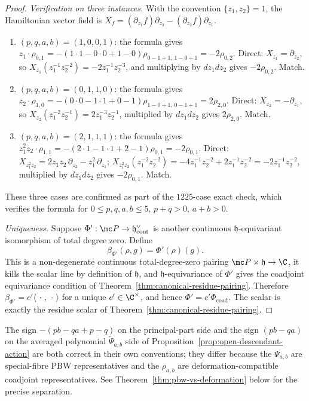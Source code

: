 \documentclass[11pt]{memoir}
\begin{document}
\begin{proof}
  \emph{Verification on three instances.} With the convention
  $\{z_1,z_2\}=1$, the Hamiltonian vector field is
  $X_f=(\partial_{z_1}f)\partial_{z_2}-(\partial_{z_2}f)\partial_{z_1}$.
  \begin{enumerate}
    \item $(p,q,a,b)=(1,0,0,1)$: the formula gives
      $z_1\cdot\rho_{0,1}=-(1\cdot1-0\cdot0+1-0)\rho_{0-1+1,\,1-0+1}=-2\rho_{0,2}$.
      Direct: $X_{z_1}=\partial_{z_2}$, so
      $X_{z_1}(z_1^{-1}z_2^{-2})=-2z_1^{-1}z_2^{-3}$, and multiplying by
      $dz_1dz_2$ gives $-2\rho_{0,2}$. Match.
    \item $(p,q,a,b)=(0,1,1,0)$: the formula gives
      $z_2\cdot\rho_{1,0}=-(0\cdot0-1\cdot1+0-1)\rho_{1-0+1,\,0-1+1}=2\rho_{2,0}$.
      Direct: $X_{z_2}=-\partial_{z_1}$, so
      $X_{z_2}(z_1^{-2}z_2^{-1})=2z_1^{-3}z_2^{-1}$, multiplied by
      $dz_1dz_2$ gives $2\rho_{2,0}$. Match.
    \item $(p,q,a,b)=(2,1,1,1)$: the formula gives
      $z_1^2z_2\cdot\rho_{1,1}=-(2\cdot1-1\cdot1+2-1)\rho_{0,1}=-2\rho_{0,1}$.
      Direct:
      $X_{z_1^2z_2}=2z_1z_2\,\partial_{z_2}-z_1^2\,\partial_{z_1}$;
      $X_{z_1^2z_2}(z_1^{-2}z_2^{-2})
       =-4z_1^{-1}z_2^{-2}+2z_1^{-1}z_2^{-2}
       =-2z_1^{-1}z_2^{-2}$, multiplied by $dz_1dz_2$ gives
      $-2\rho_{0,1}$. Match.
  \end{enumerate}
  These three cases are confirmed as part of the \(1225\)-case exact
  check, which verifies the formula for \(0\le p,q,a,b\le5\),
  \(p+q>0\), \(a+b>0\).

  \emph{Uniqueness.} Suppose $\Phi':\mc P\to\mathfrak h^\vee_{\mathrm{cont}}$
  is another continuous $\mathfrak h$-equivariant isomorphism of total
  degree zero. Define
  $$\beta_{\Phi'}(\rho,g)=\Phi'(\rho)(g).$$
  This is a non-degenerate continuous total-degree-zero pairing
  $\mc P\times\mathfrak h\to\C$, it kills the scalar line by definition
  of $\mathfrak h$, and $\mathfrak h$-equivariance of $\Phi'$ gives the
  coadjoint equivariance condition of
  Theorem~\ref{thm:canonical-residue-pairing}. Therefore
  $\beta_{\Phi'}=c'\langle\,\cdot\,,\,\cdot\,\rangle$ for a unique
  $c'\in\C^\times$, and hence
  $\Phi'=c'\Phi_{\mathrm{coad}}$. The scalar is exactly the residue
  scalar of Theorem~\ref{thm:canonical-residue-pairing}.
\end{proof}

\begin{rmk}\label{rmk:psi-rho-sign-convention}
  The sign $-(pb-qa+p-q)$ on the principal-part side and the sign
  $(pb-qa)$ on the averaged polynomial \(\widetilde\Psi_{a,b}\) side of
  Proposition~\ref{prop:open-descendant-action} are both correct in
  their own conventions; they differ because the $\Psi_{a,b}$ are
  special-fibre PBW representatives and the $\rho_{a,b}$ are
  deformation-compatible coadjoint representatives. See
  Theorem~\ref{thm:pbw-vs-deformation} below for the precise
  separation.
\end{rmk}
\end{document}
